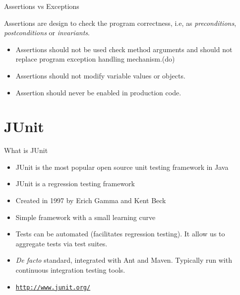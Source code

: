 \documentclass[11pt, xcolor=svgnames]{beamer}
\begin{document}

\begin{frame}[fragile]{Assertions vs Exceptions}

Assertions are design to check the program correctness, i.e, as \emph{preconditions}, \emph{postconditions} or \emph{invariants}.

\begin{itemize}
 \item Assertions should not be used check method arguments and should not replace program exception handling mechanism.\newline (do)
 \item Assertions should not modify variable values or objects.
 \item Assertion should never be enabled in production code.
\end{itemize}


\end{frame}



\section{JUnit}


\begin{frame}{What is JUnit}

  \begin{itemize}
     \item JUnit is the most popular open source unit testing framework in Java
     \item JUnit is a regression testing framework
     \item Created in 1997 by Erich Gamma and Kent Beck
     \item Simple framework with a small learning curve
     \item Tests can be automated (facilitates regression testing). It allow us to aggregate tests via test suites.
     \item \textit{De facto} standard, integrated with Ant and Maven. Typically run with continuous integration testing tools. 
     \item \texttt{\url{http://www.junit.org/}}
  \end{itemize}
\end{frame}
\end{document}

